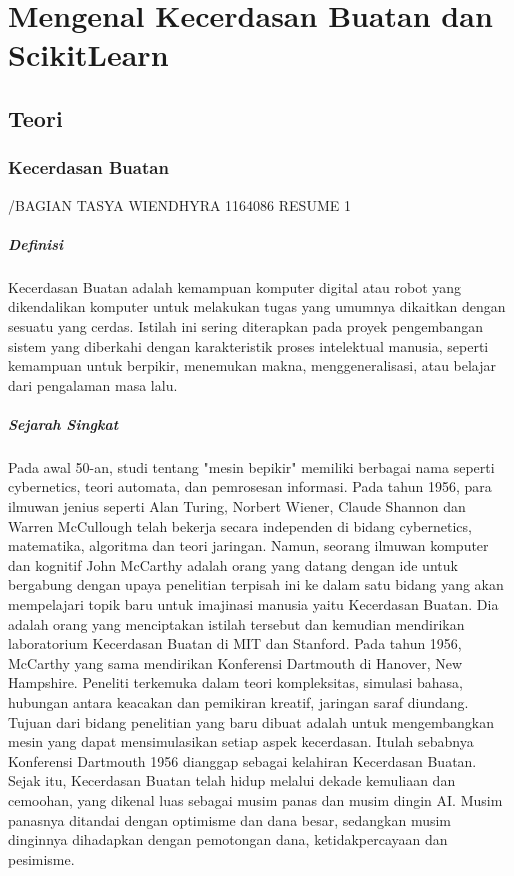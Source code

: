 \chapter{Mengenal Kecerdasan Buatan dan ScikitLearn}

\section{Teori}

\subsection{Kecerdasan Buatan} /BAGIAN TASYA WIENDHYRA 1164086
RESUME 1

\paragraph{Definisi}\hspace{0pt} \par
Kecerdasan Buatan adalah kemampuan komputer digital atau robot yang dikendalikan komputer untuk melakukan tugas yang umumnya dikaitkan dengan sesuatu yang cerdas. Istilah ini sering diterapkan pada proyek pengembangan sistem yang diberkahi dengan karakteristik proses intelektual manusia, seperti kemampuan untuk berpikir, menemukan makna, menggeneralisasi, atau belajar dari pengalaman masa lalu.

\paragraph{Sejarah Singkat}\hspace{0pt}\par
Pada awal 50-an, studi tentang "mesin bepikir" memiliki berbagai nama seperti cybernetics, teori automata, dan pemrosesan informasi. Pada tahun 1956, para ilmuwan jenius seperti Alan Turing, Norbert Wiener, Claude Shannon dan Warren McCullough telah bekerja secara independen di bidang cybernetics, matematika, algoritma dan teori jaringan.
Namun, seorang ilmuwan komputer dan kognitif John McCarthy adalah orang yang datang dengan ide untuk bergabung dengan upaya penelitian terpisah ini ke dalam satu bidang yang akan mempelajari topik baru untuk imajinasi manusia yaitu Kecerdasan Buatan. Dia adalah orang yang menciptakan istilah tersebut dan kemudian mendirikan laboratorium Kecerdasan Buatan di MIT dan Stanford.
Pada tahun 1956, McCarthy yang sama mendirikan Konferensi Dartmouth di Hanover, New Hampshire. Peneliti terkemuka dalam teori kompleksitas, simulasi bahasa, hubungan antara keacakan dan pemikiran kreatif, jaringan saraf diundang. Tujuan dari bidang penelitian yang baru dibuat adalah untuk mengembangkan mesin yang dapat mensimulasikan setiap aspek kecerdasan. Itulah sebabnya Konferensi Dartmouth 1956 dianggap sebagai kelahiran Kecerdasan Buatan.
Sejak itu, Kecerdasan Buatan telah hidup melalui dekade kemuliaan dan cemoohan, yang dikenal luas sebagai musim panas dan musim dingin AI. Musim panasnya ditandai dengan optimisme dan dana besar, sedangkan musim dinginnya dihadapkan dengan pemotongan dana, ketidakpercayaan dan pesimisme.

